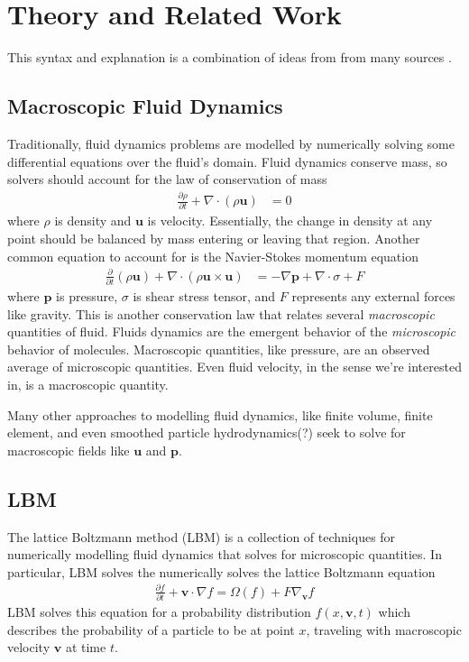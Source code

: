 \section{Theory and Related Work}\label{sec:relatedwork}

This syntax and explanation is a combination of ideas from from many sources \cite{Lyu2021,Li2020,Mei2006,Yu2005,Kruger2018}.

\subsection{Macroscopic Fluid Dynamics}

Traditionally, fluid dynamics problems are 
modelled by numerically solving some 
differential equations over the fluid's domain.
Fluid dynamics conserve mass, so solvers should account for the law of conservation of mass
\begin{align}
  \frac{\partial \rho}{\partial t} + \nabla \cdot (\rho \bm{u}) &= 0
\end{align}
where $\rho$ is density and $\bm{u}$ is velocity. 
Essentially, the change in density at any point should be 
balanced by mass entering or leaving that region.
Another common equation to account for is the Navier-Stokes momentum equation
\begin{align}
\frac{\partial}{\partial t} (\rho \bm{u}) 
+ \nabla \cdot (\rho \bm{u} \times \bm{u}) &= 
- \nabla \bm{p} + \nabla \cdot \sigma + F
\end{align}
where $\bm{p}$ is pressure, $\sigma$ is shear stress tensor, and $F$
represents any external forces like gravity. 
This is another conservation law that relates several \textit{macroscopic}
quantities of fluid.
Fluids dynamics are the emergent behavior of the \textit{microscopic} 
behavior of molecules.
Macroscopic quantities, like pressure, are an observed average of 
microscopic quantities.
Even fluid velocity, in the sense we're interested in, 
is a macroscopic quantity.

Many other approaches to modelling fluid dynamics,
like finite volume, finite element, and even 
smoothed particle hydrodynamics(?)
seek to solve for macroscopic 
fields like $\bm{u}$ and $\bm{p}$.

\subsection{LBM}
The lattice Boltzmann method (LBM) is a collection of techniques for
numerically modelling fluid dynamics that solves for microscopic quantities.
In particular, LBM solves the numerically solves 
the lattice Boltzmann equation
\begin{align}\label{eqn:cont_lbm}
  \frac{\partial f}{\partial t} + \bm{v} \cdot \nabla f = \Omega(f) + F\nabla_{\bm{v}} f
\end{align}
LBM solves this equation for a probability distribution $f(x, \bm{v}, t)$ which
describes the probability of a particle to be at point $x$, traveling with macroscopic velocity $\bm{v}$ at time $t$.

